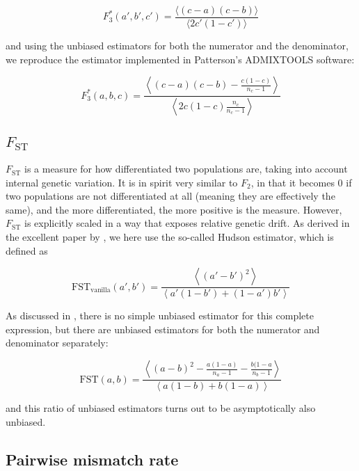 \documentclass{article}
\begin{document}
\begin{equation}
F_3^*(a',b',c')=\frac{\langle (c-a)(c-b)\rangle}{\langle 2 c'(1-c' )\rangle}
\end{equation}

and using the unbiased estimators for both the numerator and the denominator, we reproduce the estimator implemented in Patterson{'}s ADMIXTOOLS
software:

\begin{equation}
F_3^*(a,b,c)=\frac{\left\langle (c-a)(c-b)-\frac{c(1-c)}{n_c-1}\right\rangle}{\left\langle 2 c(1-c )\frac{n_c}{n_c-1}\right\rangle}
\end{equation}

\subsection{$F_\text{ST}$}

$F_\text{ST}$ is a measure for how differentiated two populations are, taking into account internal genetic variation. It is in spirit very similar to $F_2$, in that it becomes 0 if two populations are not differentiated at all (meaning they are effectively the same), and the more differentiated, the more positive is the measure. However, $F_\text{ST}$ is explicitly scaled in a way that exposes relative genetic drift. As derived in the excellent paper by \cite{Bhatia2013-qj}, we here use the so-called Hudson estimator, which is defined as 

\begin{equation}
\text{FST}_\text{vanilla}(a',b')=\frac{\left\langle\left(a'-b'\right)^2\right\rangle}{\left\langle a' \left(1-b'\right)+\left(1-a'\right) b'\right\rangle}
\end{equation}

As discussed in \cite{Bhatia2013-qj}, there is no simple unbiased estimator for this complete expression, but there are unbiased estimators for both the numerator and denominator separately:

\begin{equation}
\text{FST}(a,b)=\frac{\left\langle\left(a-b\right)^2-\frac{a(1-a)}{n_a-1} - \frac{b(1-a}{n_b-1}\right\rangle}
{\left\langle a(1-b) + b(1-a)\right\rangle}
\end{equation}

and this ratio of unbiased estimators turns out to be asymptotically also unbiased.

\subsection{Pairwise mismatch rate}
\end{document}
